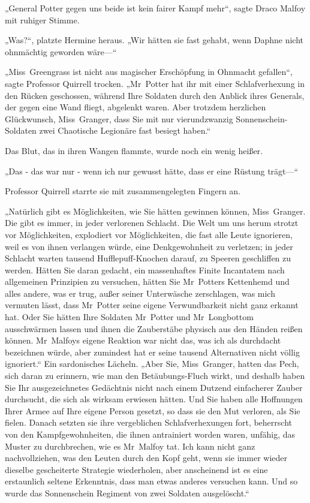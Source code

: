 {„General Potter gegen uns beide ist kein fairer Kampf mehr“, sagte Draco Malfoy mit ruhiger Stimme.

„Was?“, platzte Hermine heraus. „Wir hätten sie fast gehabt, wenn Daphne nicht ohnmächtig geworden wäre—“

„Miss~Greengrass ist nicht aus magischer Erschöpfung in Ohnmacht gefallen“, sagte Professor Quirrell trocken. „Mr~Potter hat ihr mit einer Schlafverhexung in den Rücken geschossen, während Ihre Soldaten durch den Anblick ihres Generals, der gegen eine Wand fliegt, abgelenkt waren. Aber trotzdem herzlichen Glückwunsch, Miss~Granger, dass Sie mit nur vierundzwanzig Sonnenschein-Soldaten zwei Chaotische Legionäre fast besiegt haben.“

Das Blut, das in ihren Wangen flammte, wurde noch ein wenig heißer.

„Das - das war nur - wenn ich nur gewusst hätte, dass er eine Rüstung trägt—“

Professor Quirrell starrte sie mit zusammengelegten Fingern an.

„Natürlich gibt es Möglichkeiten, wie Sie hätten gewinnen können, Miss~Granger. Die gibt es immer, in jeder verlorenen Schlacht. Die Welt um uns herum strotzt vor Möglichkeiten, explodiert vor Möglichkeiten, die fast alle Leute ignorieren, weil es von ihnen verlangen würde, eine Denkgewohnheit zu verletzen; in jeder Schlacht warten tausend Hufflepuff-Knochen darauf, zu Speeren geschliffen zu werden. Hätten Sie daran gedacht, ein massenhaftes Finite Incantatem nach allgemeinen Prinzipien zu versuchen, hätten Sie Mr~Potters Kettenhemd und alles andere, was er trug, außer seiner Unterwäsche zerschlagen, was mich vermuten lässt, dass Mr~Potter seine eigene Verwundbarkeit nicht ganz erkannt hat. Oder Sie hätten Ihre Soldaten Mr~Potter und Mr~Longbottom ausschwärmen lassen und ihnen die Zauberstäbe physisch aus den Händen reißen können. Mr~Malfoys eigene Reaktion war nicht das, was ich als durchdacht bezeichnen würde, aber zumindest hat er seine tausend Alternativen nicht völlig ignoriert.“ Ein sardonisches Lächeln. „Aber Sie, Miss~Granger, hatten das Pech, sich daran zu erinnern, wie man den Betäubungs-Fluch wirkt, und deshalb haben Sie Ihr ausgezeichnetes Gedächtnis nicht nach einem Dutzend einfacherer Zauber durchsucht, die sich als wirksam erwiesen hätten. Und Sie haben alle Hoffnungen Ihrer Armee auf Ihre eigene Person gesetzt, so dass sie den Mut verloren, als Sie fielen. Danach setzten sie ihre vergeblichen Schlafverhexungen fort, beherrscht von den Kampfgewohnheiten, die ihnen antrainiert worden waren, unfähig, das Muster zu durchbrechen, wie es Mr~Malfoy tat. Ich kann nicht ganz nachvollziehen, was den Leuten durch den Kopf geht, wenn sie immer wieder dieselbe gescheiterte Strategie wiederholen, aber anscheinend ist es eine erstaunlich seltene Erkenntnis, dass man etwas anderes versuchen kann. Und so wurde das Sonnenschein Regiment von zwei Soldaten ausgelöscht.“

}
